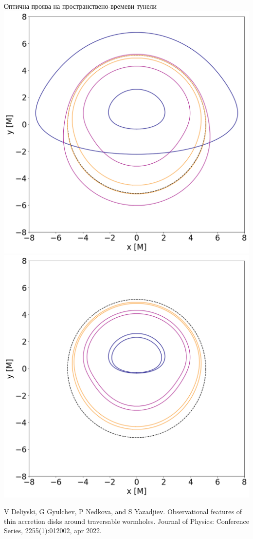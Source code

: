 \documentclass[hyperref={colorlinks,citecolor=blue,linkcolor=blue,urlcolor=blue}]{beamer}
\begin{document}
	\begin{frame}{Оптична проява на пространствено-времеви тунели}		
		\centering
		\includegraphics[scale = 0.2]{Section_6_Morphology_of_the images_of_horizonless_spacetimes/WH_70_deg_r6_gamma_2.png}
		\includegraphics[scale = 0.2]{Section_6_Morphology_of_the images_of_horizonless_spacetimes/WH_70_deg_r6_r500.png}
		
		\tiny V Deliyski, G Gyulchev, P Nedkova, and S Yazadjiev. Observational features
		of thin accretion disks around traversable wormholes. Journal of Physics:
		Conference Series, 2255(1):012002, apr 2022.
	\end{frame}
	
\end{document}
